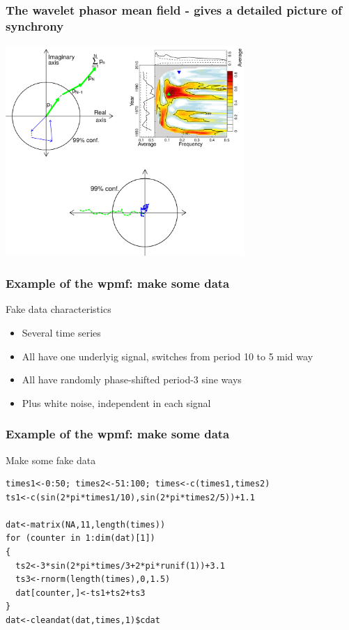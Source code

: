 \documentclass{beamer}
\begin{document}
\begin{frame}
  \frametitle{The wavelet phasor mean field - gives a detailed picture of synchrony}
  \begin{center}
    \includegraphics[height=8cm]{./figures/WPMF.png}
  \end{center}
\end{frame}

\begin{frame}[fragile]
\frametitle{Example of the wpmf: make some data}
\begin{block}{Fake data characteristics}
\begin{itemize}
\item Several time series
\item All have one underlyig signal, switches from period 10 to 5 mid way
\item All have randomly phase-shifted period-3 sine ways
\item Plus white noise, independent in each signal
\end{itemize}
\end{block}
\end{frame}

\begin{frame}[fragile]
\frametitle{Example of the wpmf: make some data}
\begin{exampleblock}{Make some fake data}
\begin{verbatim}
times1<-0:50; times2<-51:100; times<-c(times1,times2)
ts1<-c(sin(2*pi*times1/10),sin(2*pi*times2/5))+1.1 

dat<-matrix(NA,11,length(times))
for (counter in 1:dim(dat)[1])
{
  ts2<-3*sin(2*pi*times/3+2*pi*runif(1))+3.1
  ts3<-rnorm(length(times),0,1.5)
  dat[counter,]<-ts1+ts2+ts3    
}
dat<-cleandat(dat,times,1)$cdat
\end{verbatim}
\end{exampleblock}
\end{frame}
\end{document}
